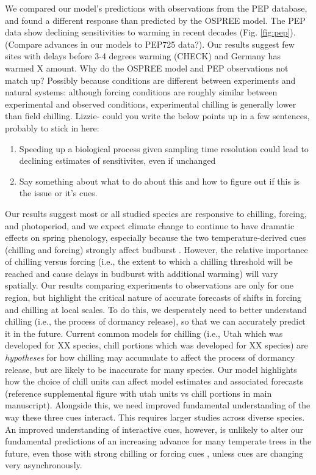 \documentclass{article}
\begin{document}
\par We compared our model's predictions with observations from the PEP database, and found a different response than predicted by the OSPREE model. The PEP data show declining sensitivities to warming in recent decades (Fig. \ref {fig:pep}). (Compare advances in our models to PEP725 data?). Our results suggest few sites with delays before 3-4 degrees warming (CHECK) and Germany has warmed X amount. Why do the OSPREE model and PEP observations not match up? Possibly because conditions are different between experiments and natural systems: although forcing conditions are roughly similar between experimental and observed conditions, experimental chilling is generally lower than field chilling. 
Lizzie- could you write the below points up in a few sentences, probably to stick in here:
\begin{enumerate}
\item Speeding up a biological process given sampling time resolution could lead to declining estimates of sensitivites, even if unchanged
\item Say something about what to do about this and how to figure out if this is the issue or it's cues. 
\end{enumerate}

\par Our results suggest most or all studied species are responsive to chilling, forcing, and photoperiod, and we expect climate change to continue to have dramatic effects on spring phenology, especially because the two temperature-derived cues (chilling and forcing) strongly affect budburst  \citep{Laube:2014a}. However, the relative importance of chilling versus forcing (i.e., the extent to which a chilling threshold will be reached and cause delays in budburst with additional warming) will vary spatially. Our results comparing experiments to observations are only for one region, but highlight the critical nature of accurate forecasts of shifts in forcing and chilling at local scales. To do this, we desperately need to better understand chilling (i.e., the process of dormancy release), so that we can accurately predict it in the future. Current common models for chilling (i.e., Utah which was developed for XX species,  chill portions which was developed for XX species) are \emph{hypotheses} for how chilling may accumulate to affect the process of dormancy release, but are likely to be inaccurate for many species. Our model highlights how the choice of chill units can affect model estimates and associated forecasts (reference supplemental figure with utah units vs chill portions in main manuscript). Alongside this, we need improved fundamental understanding of the way these three cues interact. This requires larger studies across diverse species. An improved understanding of interactive cues, however, is unlikely to alter our fundamental predictions of an increasing advance for many temperate trees in the future, even those with strong chilling or forcing cues \citep{gauzere2017}, unless cues are changing very asynchronously.
\end{document}
